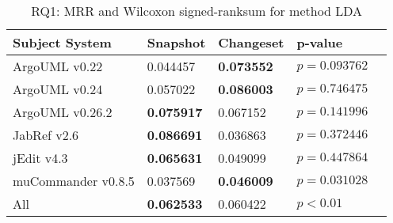 
\begin{table}[t]
\renewcommand{\arraystretch}{1.3}
\footnotesize
\centering
\caption{RQ1: MRR and Wilcoxon signed-ranksum for method LDA}
\begin{tabular}{l|ll|ll}
   \toprule
    Subject System & Snapshot & Changeset & p-value  \\
    \midrule

ArgoUML v0.22 & 0.044457 & {\bf 0.073552 } & $p = 0.093762$ \\
ArgoUML v0.24 & 0.057022 & {\bf 0.086003 } & $p = 0.746475$ \\
ArgoUML v0.26.2 & {\bf 0.075917 } & 0.067152 & $p = 0.141996$ \\
JabRef v2.6 & {\bf 0.086691 } & 0.036863 & $p = 0.372446$ \\
jEdit v4.3 & {\bf 0.065631 } & 0.049099 & $p = 0.447864$ \\
muCommander v0.8.5 & 0.037569 & {\bf 0.046009 } & $p = 0.031028$ \\
\midrule
All & {\bf 0.062533 } & 0.060422 & $p < 0.01$ \\

    \bottomrule
\end{tabular}
\label{table:rq1:method:lda}
\end{table}


